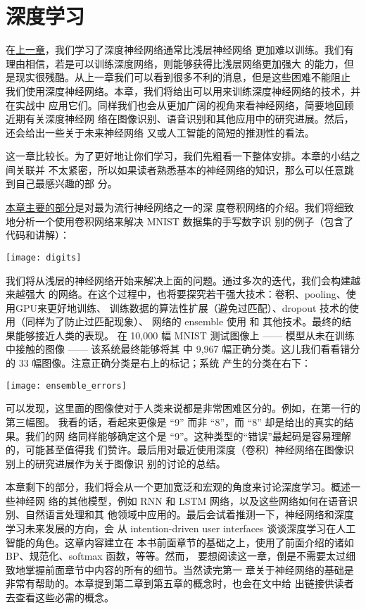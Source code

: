 
\chapter{深度学习}
\label{ch:Deeplearning}

在\hyperref[ch:WhyHardToTrain]{上一章}，我们学习了深度神经网络通常比浅层神经网络
更加难以训练。我们有理由相信，若是可以训练深度网络，则能够获得比浅层网络更加强大
的能力，但是现实很残酷。从上一章我们可以看到很多不利的消息，但是这些困难不能阻止
我们使用深度神经网络。本章，我们将给出可以用来训练深度神经网络的技术，并在实战中
应用它们。同样我们也会从更加广阔的视角来看神经网络，简要地回顾近期有关深度神经网
络在图像识别、语音识别和其他应用中的研究进展。然后，还会给出一些关于未来神经网络
又或人工智能的简短的推测性的看法。

这一章比较长。为了更好地让你们学习，我们先粗看一下整体安排。本章的小结之间关联并
不太紧密，所以如果读者熟悉基本的神经网络的知识，那么可以任意跳到自己最感兴趣的部
分。

\hyperref[sec:convolutional_networks]{本章主要的部分}是对最为流行神经网络之一的深
度卷积网络的介绍。我们将细致地分析一个使用卷积网络来解决 MNIST 数据集的手写数字识
别的例子（包含了代码和讲解）：
\begin{center}
  \texttt{[image: digits]}
\end{center}

我们将从浅层的神经网络开始来解决上面的问题。通过多次的迭代，我们会构建越来越强大
的网络。在这个过程中，也将要探究若干强大技术：卷积、pooling、使用GPU来更好地训练、
训练数据的算法性扩展（避免过匹配）、dropout 技术的使用（同样为了防止过匹配现象）、
网络的 ensemble 使用 和 其他技术。最终的结果能够接近人类的表现。
在 10,000 幅 MNIST 测试图像上 —— 模型从未在训练中接触的图像 —— 该系统最终能够将其
中 9,967 幅正确分类。这儿我们看看错分的 33 幅图像。注意正确分类是右上的标记；系统
产生的分类在右下：
\begin{center}
  \texttt{[image: ensemble\_errors]}
\end{center}

可以发现，这里面的图像使对于人类来说都是非常困难区分的。例如，在第一行的第三幅图。
我看的话，看起来更像是 “9” 而非 “8”，而 “8” 却是给出的真实的结果。我们的网
络同样能够确定这个是 “9”。这种类型的“错误”最起码是容易理解的，可能甚至值得我
们赞许。最后用对最近使用深度（卷积）神经网络在图像识别上的研究进展作为关于图像识
别的讨论的总结。

本章剩下的部分，我们将会从一个更加宽泛和宏观的角度来讨论深度学习。概述一些神经网
络的其他模型，例如 RNN 和 LSTM 网络，以及这些网络如何在语音识别、自然语言处理和其
他领域中应用的。最后会试着推测一下，神经网络和深度学习未来发展的方向，会
从 intention-driven user interfaces 谈谈深度学习在人工智能的角色。这章内容建立在
本书前面章节的基础之上，使用了前面介绍的诸如 BP、规范化、softmax 函数，等等。然而，
要想阅读这一章，倒是不需要太过细致地掌握前面章节中内容的所有的细节。当然读完第一
章关于神经网络的基础是非常有帮助的。本章提到第二章到第五章的概念时，也会在文中给
出链接供读者去查看这些必需的概念。

